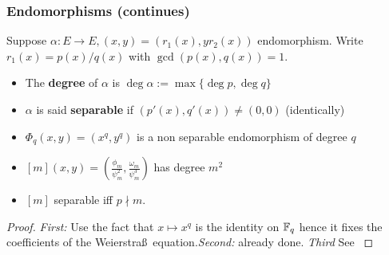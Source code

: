 \documentclass[10pt,handout]{beamer} %
\begin{document}
\begin{frame}
\frametitle{Endomorphisms (continues)}

\begin{definition} Suppose $\alpha: E\rightarrow E, (x,y)=(r_1(x),yr_2(x))$ endomorphism. Write
$r_1(x)=p(x)/q(x)$ with $\gcd(p(x),q(x))=1$.
\begin{itemize}[<+-| alert@+>]
  \item The \textbf{degree} of $\alpha$ is $\deg\alpha:=\max\{\deg p,\deg q\}$
  \item $\alpha$ is said \textbf{separable} if $(p'(x),q'(x))\neq(0,0)$ \hfill (identically)
\end{itemize}
\end{definition}\pause

\begin{lemma}
\begin{itemize}[<+-|alert@+>]
\item $\Phi_q(x,y)=(x^q,y^q)$ is a non separable endomorphism of degree $q$
\item $[m](x,y)=\left(\frac{\phi_m}{\psi_m^2},\frac{\omega_m}{\psi^3_m}\right)$ has degree $m^2$
\item $[m]$ separable iff $p\nmid m$.
\end{itemize}
\end{lemma}\pause

\begin{proof}
\alert{\emph{First:}} Use the fact that $x\mapsto x^q$ is the identity on $\mathbb F_q$ hence it
fixes the coefficients of the Weierstra\ss\ equation.\pause \alert{\emph{Second:}} already done.
\pause \alert{\emph{Third}} See \cite[Proposition 2.28]{washington}
\end{proof}
\end{frame}
\end{document}
